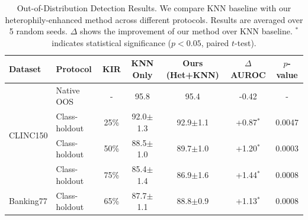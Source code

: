 \begin{table}[t]
\centering
\caption{Out-of-Distribution Detection Results. We compare KNN baseline with our heterophily-enhanced method across different protocols. Results are averaged over 5 random seeds. $\Delta$ shows the improvement of our method over KNN baseline. $^*$ indicates statistical significance ($p < 0.05$, paired $t$-test).}
\label{tab:main_results}
\begin{tabular}{llccccc}
\toprule
\textbf{Dataset} & \textbf{Protocol} & \textbf{KIR} & \textbf{KNN Only} & \textbf{Ours (Het+KNN)} & \textbf{$\Delta$ AUROC} & \textbf{$p$-value} \\
\midrule
\multirow{4}{*}{CLINC150} & Native OOS & - & 95.8 & 95.4 & -0.42 & - \\
 & Class-holdout & 25\% & 92.0$\pm$1.3 & 92.9$\pm$1.1 & +0.87$^*$ & 0.0047 \\
 & Class-holdout & 50\% & 88.5$\pm$1.0 & 89.7$\pm$1.0 & +1.20$^*$ & 0.0003 \\
 & Class-holdout & 75\% & 85.4$\pm$1.4 & 86.9$\pm$1.6 & +1.44$^*$ & 0.0008 \\
\midrule
Banking77 & Class-holdout & 65\% & 87.7$\pm$1.1 & 88.8$\pm$0.9 & +1.13$^*$ & 0.0008 \\
\bottomrule
\end{tabular}
\end{table}
